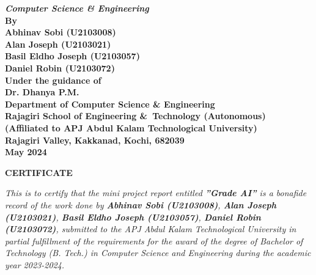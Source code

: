 \documentclass[12pt,a4paper,titlepage]{report}
\begin{document}
\begin{center}
		{\Large \bf \itshape{{Computer\; Science\; \&\; Engineering}}}\\[0.4cm]
		\large \bfseries{By}\\[.4cm]
		\large \bfseries{ Abhinav Sobi (U2103008) }\\[0.2cm]
		\large \bfseries{ Alan Joseph (U2103021) }\\[0.2cm]
		\large \bfseries{ Basil Eldho Joseph (U2103057) }\\[0.2cm]
		\large \bfseries{ Daniel Robin (U2103072) }\\[0.6cm]
		\large \bfseries{Under the guidance of}\\[0.75cm]
		\large \bfseries{Dr. Dhanya P.M.}\\[0.75cm]
		\large \textbf{Department of Computer\; Science\; \&\; Engineering}\\
		\large \textbf{Rajagiri School of Engineering \&\ Technology (Autonomous)}\\
		\small \bfseries{(Affiliated to APJ Abdul Kalam Technological University)}\\
		\large \textbf{Rajagiri Valley, Kakkanad, Kochi, 682039}\\
		\large \bfseries{May 2024}
	\end{center}
	
	\newpage
	\thispagestyle{empty}
	\begin{center}
	
		\large \bfseries{\huge{CERTIFICATE}}\\[5cm]
	\end{center}
	
	\renewcommand{\baselinestretch}{1.2}\normalsize
	
	\emph{This is to certify that the mini project report entitled \textbf{”Grade AI”} is a bonafide record of the work done by \textbf{Abhinav Sobi (U2103008)}, \textbf{Alan Joseph (U2103021)}, \textbf{Basil Eldho Joseph (U2103057)}, \textbf{Daniel Robin (U2103072)}, submitted to the APJ Abdul Kalam Technological University in 
		partial fulfillment of the requirements for the award of the degree of Bachelor of Technology (B. Tech.) in Computer Science and Engineering during the academic year 2023-2024.}\\[2.5cm]
	
\end{document}
